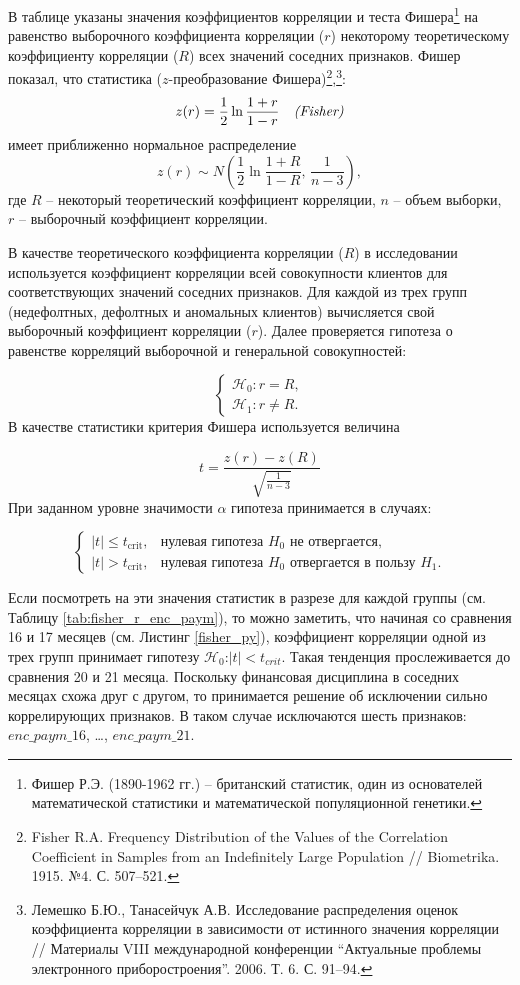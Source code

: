  В таблице указаны значения коэффициентов корреляции и теста Фишера\footnote{Фишер Р.Э. (1890-1962 гг.) -- британский статистик, один из основателей математической статистики и математической популяционной генетики.} на равенство выборочного коэффициента корреляции ($r$) некоторому теоретическому коэффициенту корреляции ($R$) всех значений соседних признаков. Фишер показал, что статистика ($z$-преобразование Фишера)\footnote{Fisher R.A. Frequency Distribution of the Values of the Correlation Coefficient in Samples from an Indefinitely Large Population // Biometrika. 1915. №4. С. 507--521.},\footnote{Лемешко Б.Ю., Танасейчук А.В. Исследование распределения оценок коэффициента корреляции в зависимости от истинного значения корреляции // Материалы VIII международной конференции “Актуальные проблемы электронного приборострое­ния”. 2006. Т. 6. С. 91--94.}:
 \[
 z(r) = \frac{1}{2}\ln\frac{1+r}{1-r} \textit{\quad (Fisher)}
 \] 
 имеет приближенно нормальное распределение 
 \[
 z(r) \sim N\!\left(\frac{1}{2}\ln\frac{1+R}{1-R},\,\frac{1}{n-3}\right),
 \]
 где $R$ -- некоторый теоретический коэффициент корреляции, $n$ -- объем выборки, $r$ -- выборочный коэффициент корреляции.
 
В качестве теоретического коэффициента корреляции ($R$) в исследовании используется коэффициент корреляции всей совокупности клиентов для соответствующих значений соседних признаков. Для каждой из трех групп (недефолтных, дефолтных и аномальных клиентов) вычисляется свой выборочный коэффициент корреляции ($r$). Далее проверяется гипотеза о равенстве корреляций выборочной и генеральной совокупностей:

\[
\begin{cases}
	\mathcal{H}_0: r = R, \\
	\mathcal{H}_1: r \neq R.
\end{cases}
\]
В качестве статистики критерия Фишера используется величина

\[
t = \frac{z(r) - z(R)}{\sqrt{\frac{1}{n-3}}}
\]
При заданном уровне значимости $\alpha$ гипотеза принимается в случаях:

\[
\begin{cases}
	|t| \le t_{\text{crit}}, & \text{нулевая гипотеза } H_0 \text{ не отвергается},\\[2mm]
	|t| > t_{\text{crit}},  & \text{нулевая гипотеза } H_0 \text{ отвергается в пользу } H_1.
\end{cases}
\]

Если посмотреть на эти значения статистик в разрезе для каждой группы %
(см. Таблицу \ref{tab:fisher_r_enc_paym}), то можно заметить, что начиная со сравнения 16 и 17 месяцев (см. Листинг \ref{fisher_py}), коэффициент корреляции одной из трех групп принимает гипотезу $\mathcal{H}_0$:$|t| < t_{crit}$. Такая тенденция прослеживается до сравнения 20 и 21 месяца. Поскольку финансовая дисциплина в соседних месяцах схожа друг с другом, то принимается решение об исключении сильно коррелирующих признаков. В таком случае исключаются шесть признаков: $enc\_paym\_16$, \dots, $enc\_paym\_21$. 

